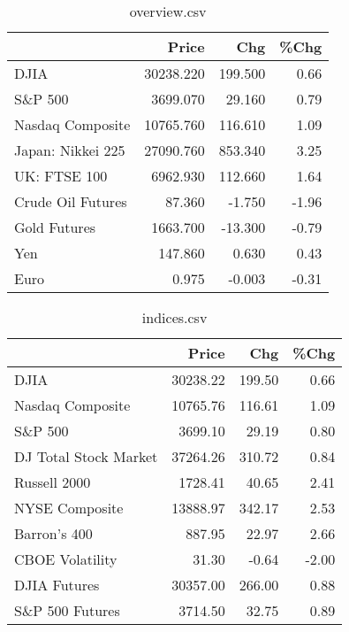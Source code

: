 \documentclass{article}%
\begin{document}
\begin{table}[htbp]%
\caption{overview.csv}%
\centering%
\begin{adjustbox}{width=1\textwidth}%
\begin{tabular}{lrrr}
\toprule
                  &     Price &     Chg &  \%Chg \\
\midrule
             DJIA & 30238.220 & 199.500 &  0.66 \\
          S\&P 500 &  3699.070 &  29.160 &  0.79 \\
 Nasdaq Composite & 10765.760 & 116.610 &  1.09 \\
Japan: Nikkei 225 & 27090.760 & 853.340 &  3.25 \\
     UK: FTSE 100 &  6962.930 & 112.660 &  1.64 \\
Crude Oil Futures &    87.360 &  -1.750 & -1.96 \\
     Gold Futures &  1663.700 & -13.300 & -0.79 \\
              Yen &   147.860 &   0.630 &  0.43 \\
             Euro &     0.975 &  -0.003 & -0.31 \\
\bottomrule
\end{tabular}
%
\end{adjustbox}%
\end{table}

%


\begin{table}[htbp]%
\caption{indices.csv}%
\centering%
\begin{adjustbox}{width=1\textwidth}%
\begin{tabular}{lrrr}
\toprule
                      &    Price &    Chg &  \%Chg \\
\midrule
                 DJIA & 30238.22 & 199.50 &  0.66 \\
     Nasdaq Composite & 10765.76 & 116.61 &  1.09 \\
              S\&P 500 &  3699.10 &  29.19 &  0.80 \\
DJ Total Stock Market & 37264.26 & 310.72 &  0.84 \\
         Russell 2000 &  1728.41 &  40.65 &  2.41 \\
       NYSE Composite & 13888.97 & 342.17 &  2.53 \\
         Barron's 400 &   887.95 &  22.97 &  2.66 \\
      CBOE Volatility &    31.30 &  -0.64 & -2.00 \\
         DJIA Futures & 30357.00 & 266.00 &  0.88 \\
      S\&P 500 Futures &  3714.50 &  32.75 &  0.89 \\
\bottomrule
\end{tabular}
%
\end{adjustbox}%
\end{table}
\end{document}
